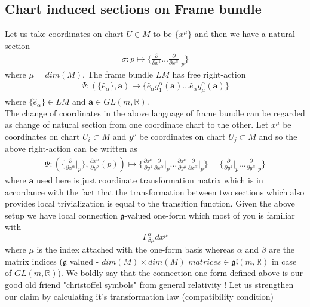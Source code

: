 \documentclass[12pt]{article}
\newcommand{\matr}[1]{\mathbf{#1}}
\begin{document}
\subsection{Chart induced sections on Frame bundle}
Let us take coordinates on chart $U \in M $ to be $\{x^{\mu}\}$ and then we have a natural section
\begin{align*}
    \sigma \colon p \mapsto \{\frac{\partial}{\partial x^{1}}\dots\frac{\partial}{\partial x^{\mu}}\Bigr|_{p}\}
\end{align*}where $\mu = dim(M)$. The frame bundle $LM$ has free right-action 
\begin{align*}
    \Psi \colon (\{\hat{e}_{\alpha}\}, \matr{a}) \mapsto \{\hat{e}_{\alpha}g^{\alpha}_{1}(\matr{a})\dots \hat{e}_{\alpha}g^{\alpha}_{\mu}(\matr{a})\}
\end{align*} where $\{\hat{e}_{\alpha}\} \in LM$ and $\matr{a} \in GL(m, \mathbb{R})$. \\
The change of coordinates in the above language of frame bundle can be regarded as change of natural section from one coordinate chart to the other. Let $x^{\mu}$ be coordinates on chart $U_{i} \subset M$ and $y^{\nu}$ be coordinates on chart $U_{j}\subset M$ and so the above right-action can be written as
\begin{align*}
    \Psi \colon (\{\frac{\partial}{\partial x^{\alpha}}\Bigr|_{p}\}, \frac{\partial x^{\sigma}}{\partial y^{\rho}}(p)) \mapsto \{\frac{\partial x^{\alpha}}{\partial y^{1}}\frac{\partial}{\partial x^{\alpha}}\Bigr|_{p}\dots \frac{\partial x^{\alpha}}{\partial y^{\mu}}\frac{\partial}{\partial x^{\alpha}}\Bigr|_{p}\} = \{\frac{\partial}{\partial y^{1}}\Bigr|_{p}\dots\frac{\partial}{\partial y^{\mu}}\Bigr|_{p}\}
\end{align*} where $\matr{a}$ used here is just coordinate transformation matrix which is in accordance with the fact that the transformation between two sections which also provides local trivialization is equal to the transition function. Given the above setup we have local connection $\mathfrak{g}$-valued one-form which most of you is familiar with
\[
\Gamma^{\alpha}_{\beta\mu}dx^{\mu}
\] where $\mu$ is the index attached with the one-form basis whereas $\alpha$ and $\beta$ are the matrix indices ($\mathfrak{g}$ valued - $dim(M)\times dim(M)$ $matrices \in \mathfrak{g}\mathfrak{l}(m, \mathbb{R})$ in case of $ GL(m, \mathbb{R}) $). We boldly say that the connection one-form defined above is our good old friend "christoffel symbols" from general relativity ! Let us strengthen our claim by calculating it's transformation law (compatibility condition)
\end{document}
